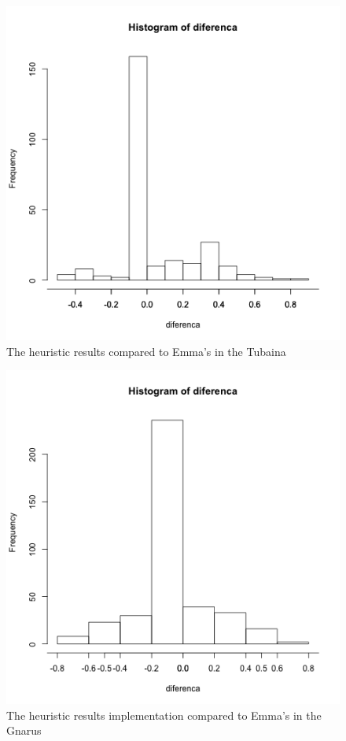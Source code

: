 \documentclass{sig-alternate}
\begin{document}
\begin{figure}[h!H]
  \centering
  \includegraphics[scale=0.28]{../stats/tubaina-histograma-aspectj.png}
  \caption{The heuristic results compared to Emma's in the Tubaina}
  \label{fig:tubaina-aj}
\end{figure}

\begin{figure}[h!H]
  \centering
  \includegraphics[scale=0.28]{../stats/gnarus-histograma-aspectj.png}
  \caption{The heuristic results implementation compared to Emma's in the Gnarus}
  \label{fig:gnarus-aj}
\end{figure}
\end{document}
